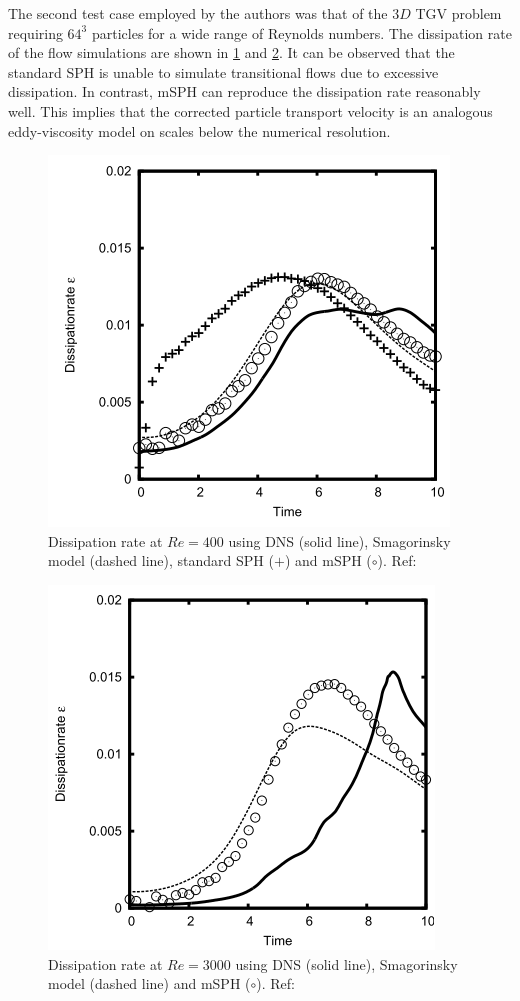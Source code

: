 The second test case employed by the authors was that of the $3D$ TGV problem requiring $64^3$ particles for a wide range of Reynolds numbers. The dissipation rate of the flow simulations are shown in \ref{fig:adami2012-dissipation-re400} and \ref{fig:adami2012-dissipation-re3000}. It can be observed that the standard SPH is unable to simulate transitional flows due to excessive dissipation. In contrast, mSPH can reproduce the dissipation rate reasonably well. This implies that the corrected particle transport velocity is an analogous eddy-viscosity model on scales below the numerical resolution.
\begin{figure}[h!]
	\centering
	\includegraphics[scale=0.7]{Figures/research_papers/adami2012-dissipation-re400.png}
	\caption{Dissipation rate at $Re = 400$ using DNS (solid line), Smagorinsky model (dashed line), standard SPH ($+$) and mSPH ($\circ$). Ref: \parencite{Adami2012}}
	\label{fig:adami2012-dissipation-re400}
\end{figure}
\begin{figure}[h!]
	\centering
	\includegraphics[scale=0.7]{Figures/research_papers/adami2012-dissipation-re3000.png}
	\caption{Dissipation rate at $Re = 3000$ using DNS (solid line), Smagorinsky model (dashed line) and mSPH ($\circ$). Ref: \parencite{Adami2012}}
	\label{fig:adami2012-dissipation-re3000}
\end{figure}

